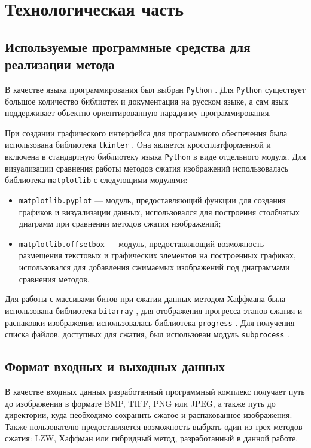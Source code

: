 \chapter{Технологическая часть}

\section{Используемые программные средства для реализации метода}

В качестве языка программирования был выбран \texttt{Python} \cite{Python}. Для \texttt{Python} существует большое количество библиотек и документация на русском языке, а сам язык поддерживает объектно-ориентированную парадигму программирования.

При создании графического интерфейса для программного обеспечения была использована библиотека \texttt{tkinter} \cite{Tkinter}. Она является кроссплатформенной и включена в стандартную библиотеку языка \texttt{Python} в виде отдельного модуля. Для визуализации сравнения работы методов сжатия изображений использовалась библиотека \texttt{matplotlib} \cite{Matplotlib} с следующими модулями:
\begin{itemize}
    \item \texttt{matplotlib.pyplot} \cite{Pyplot} --- модуль, предоставляющий функции для создания графиков и визуализации данных, использовался для построения столбчатых диаграмм при сравнении методов сжатия изображений;
    \item \texttt{matplotlib.offsetbox} \cite{OffsetBox} --- модуль, предоставляющий возможность размещения текстовых и графических элементов на построенных графиках, использовался для добавления сжимаемых изображений под диаграммами сравнения методов.
\end{itemize}

Для работы с массивами битов при сжатии данных методом Хаффмана была использована библиотека \texttt{bitarray} \cite{Bitarray}, для отображения прогресса этапов сжатия и распаковки изображения использовалась библиотека \texttt{progress} \cite{Progress}. Для получения списка файлов, доступных для сжатия, был использован модуль \texttt{subprocess} \cite{Subprocess}.


\section{Формат входных и выходных данных}

В качестве входных данных разработанный программный комплекс получает путь до изображения в формате BMP, TIFF, PNG или JPEG, а также путь до директории, куда необходимо сохранить сжатое и распакованное изображения. Также пользователю предоставляется возможность выбрать один из трех методов сжатия: LZW, Хаффман или гибридный метод, разработанный в данной работе.

